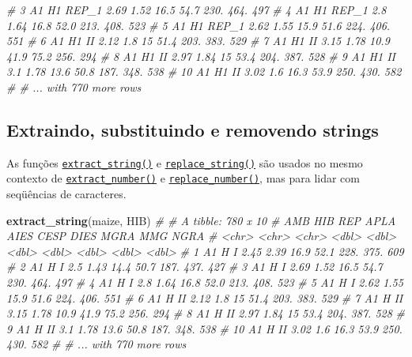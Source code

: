 \documentclass[
]{book}
\newenvironment{Shaded}{\begin{snugshade}}{\end{snugshade}}
\newcommand{\CommentTok}[1]{\textcolor[rgb]{0.56,0.35,0.01}{\textit{#1}}}
\newcommand{\KeywordTok}[1]{\textcolor[rgb]{0.13,0.29,0.53}{\textbf{#1}}}
\newcommand{\NormalTok}[1]{#1}
\numberwithin{equation}{section}
\begin{document}
\begin{Shaded}
\begin{Highlighting}[]
\CommentTok{\#  3 A1    H1    REP\_1  2.69  1.52  16.5  54.7 230.   464.   497}
\CommentTok{\#  4 A1    H1    REP\_1  2.8   1.64  16.8  52.0 213.   408.   523}
\CommentTok{\#  5 A1    H1    REP\_1  2.62  1.55  15.9  51.6 224.   406.   551}
\CommentTok{\#  6 A1    H1    II     2.12  1.8   15    51.4 203.   383.   529}
\CommentTok{\#  7 A1    H1    II     3.15  1.78  10.9  41.9  75.2  256.   294}
\CommentTok{\#  8 A1    H1    II     2.97  1.84  15    53.4 204.   387.   528}
\CommentTok{\#  9 A1    H1    II     3.1   1.78  13.6  50.8 187.   348.   538}
\CommentTok{\# 10 A1    H1    II     3.02  1.6   16.3  53.9 250.   430.   582}
\CommentTok{\# \# ... with 770 more rows}
\end{Highlighting}
\end{Shaded}

\hypertarget{extraindo-substituindo-e-removendo-strings}{%
\subsection{Extraindo, substituindo e removendo strings}\label{extraindo-substituindo-e-removendo-strings}}

As funções \href{https://tiagoolivoto.github.io/metan/reference/utils_num_str.html}{\texttt{extract\_string()}} e \href{https://tiagoolivoto.github.io/metan/\%20reference\%20/\%20utils_num_str.html}{\texttt{replace\_string()}} são usados no mesmo contexto de \href{https://tiagoolivoto.github.io/metan/reference/utils_num_str.html}{\texttt{extract\_number()}} e \href{https\%20:\%20//tiagoolivoto.github.io/metan/reference/utils_num_str.html}{\texttt{replace\_number()}}, mas para lidar com seqüências de caracteres.

\begin{Shaded}
\begin{Highlighting}[]
\KeywordTok{extract\_string}\NormalTok{(maize, HIB)}
\CommentTok{\# \# A tibble: 780 x 10}
\CommentTok{\#    AMB   HIB   REP    APLA  AIES  CESP  DIES  MGRA   MMG  NGRA}
\CommentTok{\#    \textless{}chr\textgreater{} \textless{}chr\textgreater{} \textless{}chr\textgreater{} \textless{}dbl\textgreater{} \textless{}dbl\textgreater{} \textless{}dbl\textgreater{} \textless{}dbl\textgreater{} \textless{}dbl\textgreater{} \textless{}dbl\textgreater{} \textless{}dbl\textgreater{}}
\CommentTok{\#  1 A1    H     I      2.45  2.39  16.9  52.1 228.   375.   609}
\CommentTok{\#  2 A1    H     I      2.5   1.43  14.4  50.7 187.   437.   427}
\CommentTok{\#  3 A1    H     I      2.69  1.52  16.5  54.7 230.   464.   497}
\CommentTok{\#  4 A1    H     I      2.8   1.64  16.8  52.0 213.   408.   523}
\CommentTok{\#  5 A1    H     I      2.62  1.55  15.9  51.6 224.   406.   551}
\CommentTok{\#  6 A1    H     II     2.12  1.8   15    51.4 203.   383.   529}
\CommentTok{\#  7 A1    H     II     3.15  1.78  10.9  41.9  75.2  256.   294}
\CommentTok{\#  8 A1    H     II     2.97  1.84  15    53.4 204.   387.   528}
\CommentTok{\#  9 A1    H     II     3.1   1.78  13.6  50.8 187.   348.   538}
\CommentTok{\# 10 A1    H     II     3.02  1.6   16.3  53.9 250.   430.   582}
\CommentTok{\# \# ... with 770 more rows}
\end{Highlighting}
\end{Shaded}
\end{document}
